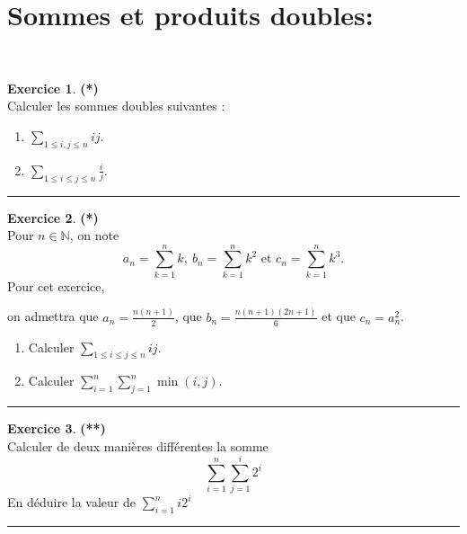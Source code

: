 \documentclass[a4paper,11pt]{article}
\theoremstyle{definition}
\newtheorem{exo}{Exercice} %
\begin{document}
\section*{Sommes et produits doubles:}\hfill\\%
\begin{minipage}{1\linewidth}
	\begin{minipage}[c]{0.48\linewidth}
		\raggedright
		
				
		\begin{exo}\textbf{(*)}\quad\\[0.2cm]
			Calculer les sommes doubles suivantes :
			\begin{enumerate}
				\item $\sum_{1\leq i,j\leq n}ij$.
				\item $\sum_{1\leq i\leq j\leq n}\frac ij$.
			\end{enumerate}
			\centering
			\rule{1\linewidth}{0.6pt}
		\end{exo}
	
				
		\begin{exo}\textbf{(*)}\quad\\[0.2cm]
	Pour $n\in\mathbb N$, on note
	$$a_n=\sum_{k=1}^n k,\ b_n=\sum_{k=1}^n k^2\textrm{ et }c_n=\sum_{k=1}^n k^3.$$
	Pour cet exercice,
	
	 on admettra que $\displaystyle a_n=\frac{n(n+1)}2$,
	  que $\displaystyle b_n=\frac{n(n+1)(2n+1)}6$ et que $c_n=a_n^2$.\quad\\[0.2cm]
	\begin{enumerate}
		\item Calculer $\displaystyle \sum_{1\leq i\leq j\leq n} ij$.
		\item  Calculer $\displaystyle \sum_{i=1}^n\sum_{j=1}^n \min(i,j)$.
	\end{enumerate}
	
			\centering
			\rule{1\linewidth}{0.6pt}
		\end{exo}

				
		\begin{exo}\textbf{(**)}\quad\\[0.2cm]
			
			Calculer de deux manières différentes la somme $$\displaystyle\sum_{i=1}^{n}{\displaystyle\sum_{j = 1}^{i}{2^i}}$$
			En déduire la valeur de $\displaystyle\sum_{i=1}^{n}{i2^i}$
			
			\centering
			\rule{1\linewidth}{0.6pt}
		\end{exo}
		
		
		

\end{minipage}
\end{minipage}
\end{document}
